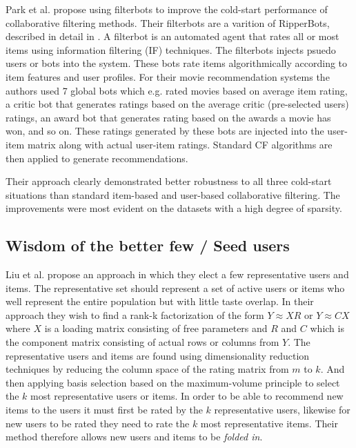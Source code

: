 Park et al. \cite{Park2006} propose using filterbots to improve the cold-start
performance of collaborative filtering methods. Their filterbots are a varition
of RipperBots, described in detail in \cite{Good1999}. A filterbot is an
automated agent that rates all or most items using information filtering (IF)
techniques. The filterbots injects psuedo users or bots into the system. These
bots rate items algorithmically according to item features and user profiles.
For their movie recommendation systems the authors used 7 global bots which
e.g. rated movies based on average item rating, a critic bot that generates ratings
based on the average critic (pre-selected users) ratings, an award bot that
generates rating based on the awards a movie has won, and so on. These ratings
generated by these bots are injected into the user-item matrix along with
actual user-item ratings. Standard CF algorithms are then applied to generate
recommendations.

Their approach clearly demonstrated better robustness to all three cold-start situations than standard item-based
and user-based collaborative filtering. The improvements were most evident on
the datasets with a high degree of sparsity.

\subsection{Wisdom of the better few / Seed users}


Liu et al. \cite{Liu2011} propose an approach in which they elect a few
representative users and items. The representative set should represent a set
of active users or items who well represent the entire population but with
little taste overlap. In their approach they wish to find a rank-k
factorization of the form $Y \approx XR$ or $Y \approx CX$ where $X$ is a
loading matrix consisting of free parameters and $R$ and $C$ which is the
component matrix consisting of actual rows or columns from $Y$. The
representative users and items are found using dimensionality reduction
techniques by reducing the column space of the rating matrix from $m$ to $k$.
And then applying basis selection based on the maximum-volume principle to
select the $k$ most representative users or items. In order to be able to
recommend new items to the users it must first be rated by the $k$
representative users, likewise for new users to be rated they need to rate the
$k$ most representative items. Their method therefore allows new users
and items to be \emph{folded in}.

